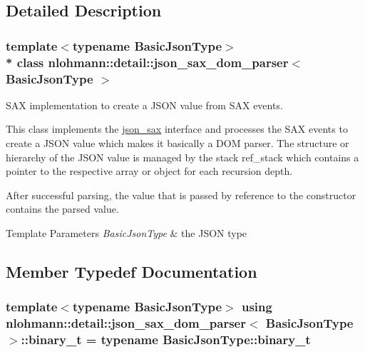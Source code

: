 \subsection{Detailed Description}
\subsubsection*{template$<$typename Basic\+Json\+Type$>$\\*
class nlohmann\+::detail\+::json\+\_\+sax\+\_\+dom\+\_\+parser$<$ Basic\+Json\+Type $>$}

S\+AX implementation to create a J\+S\+ON value from S\+AX events. 

This class implements the \hyperlink{structnlohmann_1_1json__sax}{json\+\_\+sax} interface and processes the S\+AX events to create a J\+S\+ON value which makes it basically a D\+OM parser. The structure or hierarchy of the J\+S\+ON value is managed by the stack {\ttfamily ref\+\_\+stack} which contains a pointer to the respective array or object for each recursion depth.

After successful parsing, the value that is passed by reference to the constructor contains the parsed value.


\begin{DoxyTemplParams}{Template Parameters}
{\em Basic\+Json\+Type} & the J\+S\+ON type \\
\hline
\end{DoxyTemplParams}


\subsection{Member Typedef Documentation}
\subsubsection[{\texorpdfstring{binary\+\_\+t}{binary_t}}]{\setlength{\rightskip}{0pt plus 5cm}template$<$typename Basic\+Json\+Type$>$ using {\bf nlohmann\+::detail\+::json\+\_\+sax\+\_\+dom\+\_\+parser}$<$ Basic\+Json\+Type $>$\+::{\bf binary\+\_\+t} =  typename Basic\+Json\+Type\+::binary\+\_\+t}\hypertarget{classnlohmann_1_1detail_1_1json__sax__dom__parser_a188c267325965fdbe487ce68ab5496aa}{}\label{classnlohmann_1_1detail_1_1json__sax__dom__parser_a188c267325965fdbe487ce68ab5496aa}
